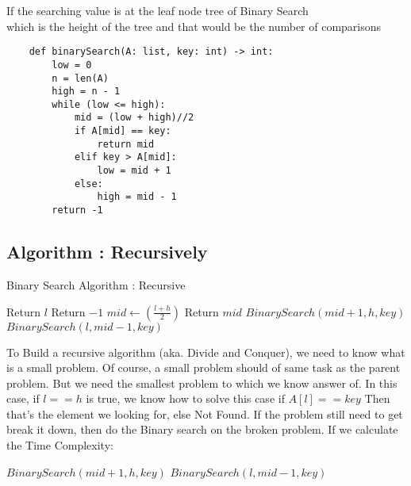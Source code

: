 \documentclass[11pt, a4paper]{article}
\begin{document}
If the searching value is at the leaf node tree of Binary Search
\\ which is the height of the tree and that would be the number of comparisons\\ 


\begin{verbatim}
    def binarySearch(A: list, key: int) -> int:
        low = 0
        n = len(A)
        high = n - 1
        while (low <= high):
            mid = (low + high)//2
            if A[mid] == key:
                return mid
            elif key > A[mid]:
                low = mid + 1 
            else:
                high = mid - 1
        return -1
    \end{verbatim}

\subsection{Algorithm : Recursively}
\begin{algorithm}[H]
    \caption{Binary Search Algorithm : Recursive}
    \label{binarySearchrec}
    \begin{algorithmic}
                    \State Return $l$
                \Else
                    \State Return $-1$
                \EndIf
            \Else 
                \State $mid \gets \left(\frac{l + h}{2}\right)$
                    \State Return $mid$
                \EndIf
                    \State $BinarySearch(mid + 1, h, key)$
                \Else
                    \State $BinarySearch(l, mid - 1, key)$ 
                \EndIf
            \EndIf
        \EndProcedure
    \end{algorithmic}
\end{algorithm}

To Build a recursive algorithm (aka. Divide and Conquer), we need to know what is a small problem. Of course, a small problem should of same task as the parent problem. But we need the smallest problem to which we know answer of. 
In this case, if $l == h$ is true, we know how to solve this case if $A[l] == key$ Then that's the element we looking for, else Not Found. If the problem still need to get break it down, then do the Binary search on the broken problem. If we calculate the Time Complexity:

\begin{algorithmic}
        \State $BinarySearch(mid + 1, h, key)$
    \Else
        \State $BinarySearch(l, mid - 1, key)$ 
    \EndIf
\end{algorithmic}
\end{document}
